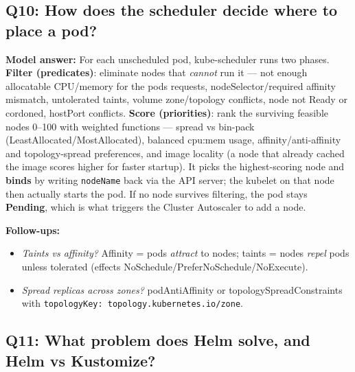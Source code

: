 \documentclass[11pt]{article}
\providecommand{\tightlist}{\setlength{\itemsep}{1pt}\setlength{\parskip}{0pt}}
\begin{document}
\subsection{Q10: How does the scheduler decide where to place a pod?}\label{q10-how-does-the-scheduler-decide-where-to-place-a-pod}

\textbf{Model answer:}
For each unscheduled pod, kube-scheduler runs two phases. \textbf{Filter (predicates)}: eliminate nodes that \emph{cannot} run it --- not enough allocatable CPU/memory for the pod\textquotesingle s requests, nodeSelector/required affinity mismatch, untolerated taints, volume zone/topology conflicts, node not Ready or cordoned, hostPort conflicts. \textbf{Score (priorities)}: rank the surviving feasible nodes 0--100 with weighted functions --- spread vs bin-pack (LeastAllocated/MostAllocated), balanced cpu:mem usage, affinity/anti-affinity and topology-spread preferences, and image locality (a node that already cached the image scores higher for faster startup). It picks the highest-scoring node and \textbf{binds} by writing \texttt{nodeName} back via the API server; the kubelet on that node then actually starts the pod. If no node survives filtering, the pod stays \textbf{Pending}, which is what triggers the Cluster Autoscaler to add a node.

\textbf{Follow-ups:}

\begin{itemize}
\tightlist
\item
  \emph{Taints vs affinity?} Affinity = pods \emph{attract} to nodes; taints = nodes \emph{repel} pods unless tolerated (effects NoSchedule/PreferNoSchedule/NoExecute).
\item
  \emph{Spread replicas across zones?} podAntiAffinity or topologySpreadConstraints with \texttt{topologyKey:\ topology.kubernetes.io/zone}.
\end{itemize}

\subsection{Q11: What problem does Helm solve, and Helm vs Kustomize?}\label{q11-what-problem-does-helm-solve-and-helm-vs-kustomize}
\end{document}

